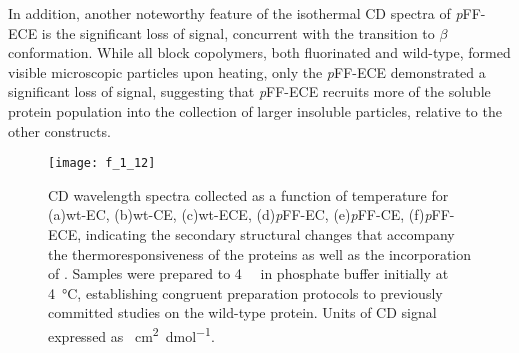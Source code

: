 \begin{refsection}
In addition, another noteworthy feature of the isothermal CD spectra
of \emph{p}FF-ECE is the significant loss of signal, concurrent with the
transition to ${\beta}$ conformation. While all block copolymers, both fluorinated
and wild-type, formed visible microscopic particles upon heating, only the
\emph{p}FF-ECE demonstrated a significant loss of signal, suggesting that
\emph{p}FF-ECE recruits more of the soluble protein population into the
collection of larger insoluble particles, relative to the other constructs.
\begin{figure}[h!] \centering \texttt{[image: f\_1\_12]}
    \caption[CD wavelength spectra collected as a function of temperature for
        (a)wt-EC, (b)wt-CE, (c)wt-ECE, (d)\emph{p}FF-EC, (e)\emph{p}FF-CE,
        (f)\emph{p}FF-ECE, indicating the secondary structural changes that
        accompany the thermoresponsiveness of the proteins as well as the
        incorporation of .  Samples were
        prepared to \SI{4}{\micro\moLar} in phosphate buffer initially at
        \SI{4}{\celsius}, establishing congruent preparation protocols to
        previously committed studies on the wild-type protein. Units of CD
    signal expressed as \si{\degtext\cm\squared\per\deci\mol}.]
{CD wavelength spectra collected as a function of temperature for (a)wt-EC,
    (b)wt-CE, (c)wt-ECE, (d)\emph{p}FF-EC, (e)\emph{p}FF-CE, (f)\emph{p}FF-ECE,
    indicating the secondary structural changes that accompany the
    thermoresponsiveness of the proteins as well as the incorporation of
    .  Samples were prepared to
    \SI{4}{\micro\moLar} in phosphate buffer initially at \SI{4}{\celsius},
    establishing congruent preparation protocols to previously committed studies
    on the wild-type protein.\cite{Haghpanah2009} Units of CD signal expressed
    as \si{\degtext\cm\squared\per\deci\mol}.}
    
    \label{fig:CD_temp_wl}
\end{figure}


\end{refsection}

